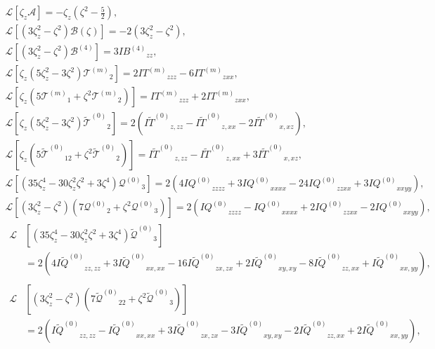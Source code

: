 \documentclass[]{elsarticle} %
\newcommand{\B}{\ensuremath{\mathcal{B}^{(4)}}}
\newcommand{\Q}{\ensuremath{\mathcal{Q}^{(0)}}}
\newcommand{\T}[1]{\ensuremath{\mathcal{T}^{(#1)}}}
\newcommand{\TT}{\ensuremath{\tilde{\mathcal{T}}^{(0)}}}
\newcommand{\QQ}{\ensuremath{\tilde{\mathcal{Q}}^{(0)}}}
\newcommand{\IF}[2][0]{\ensuremath{I{#2}^{(#1)}}}
\newcommand{\IFF}[1]{\ensuremath{I\tilde{#1}^{(0)}}}
\begin{document}
\begin{gather}
    \mathcal{L}\left[\zeta_z\mathcal{A}\right]
        = -\zeta_z\left(\zeta^2-\frac52\right), \label{eq:A}\\[6pt]
    \mathcal{L}\left[\left(3\zeta_z^2 - \zeta^2\right)\mathcal{B}(\zeta)\right]
        = -2\left(3\zeta_z^2 - \zeta^2\right), \label{eq:B}\\
    \mathcal{L}\left[\left(3\zeta_z^2 - \zeta^2\right)\B\right]
        = 3\IF[4]{B}_{zz}, \label{eq:B4}\\[6pt]
    \mathcal{L}\left[\zeta_z\left(5\zeta_z^2 - 3\zeta^2\right)\T{m}_2\right]
        = 2\IF[m]{T}_{zzz} - 6\IF[m]{T}_{zxx}, \label{eq:Tm1}\\
    \mathcal{L}\left[\zeta_z\left(5\T{m}_1 + \zeta^2\T{m}_2\right)\right]
        = \IF[m]{T}_{zzz} + 2\IF[m]{T}_{zxx}, \label{eq:Tm2}\\[6pt]
    \mathcal{L}\left[\zeta_z\left(5\zeta_z^2 - 3\zeta^2\right)\TT_2\right]
        = 2\left(\IFF{T}_{z,zz} - \IFF{T}_{z,xx} - 2\IFF{T}_{x,xz}\right), \label{eq:TT1}\\
    \mathcal{L}\left[\zeta_z\left(5\TT_{12} + \zeta^2\TT_2\right)\right]
        = \IFF{T}_{z,zz} - \IFF{T}_{z,xx} + 3\IFF{T}_{x,xz}, \label{eq:TT2}\\[6pt]
    \mathcal{L}\left[\left(35\zeta_z^4 - 30\zeta_z^2\zeta^2 + 3\zeta^4\right)\Q_3\right]
        = 2\left( 4\IF{Q}_{zzzz} + 3\IF{Q}_{xxxx} - 24\IF{Q}_{zzxx} + 3\IF{Q}_{xxyy} \right), \label{eq:Q1}\\
    \mathcal{L}\left[\left(3\zeta_z^2 - \zeta^2\right)\left(7\Q_2 + \zeta^2\Q_3\right)\right]
        = 2\left( \IF{Q}_{zzzz} - \IF{Q}_{xxxx} + 2\IF{Q}_{zzxx} - 2\IF{Q}_{xxyy} \right), \label{eq:Q2}\\[6pt]
    \begin{aligned}
    \mathcal{L}&\left[\left(35\zeta_z^4 - 30\zeta_z^2\zeta^2 + 3\zeta^4\right)\QQ_3\right] \\
        &= 2\left( 4\IFF{Q}_{zz,zz} + 3\IFF{Q}_{xx,xx} - 16\IFF{Q}_{zx,zx} + 2\IFF{Q}_{xy,xy} - 8\IFF{Q}_{zz,xx} + \IFF{Q}_{xx,yy} \right),
    \end{aligned}\label{eq:QQ1}\\
    \begin{aligned}
    \mathcal{L}&\left[\left(3\zeta_z^2 - \zeta^2\right)\left(7\QQ_{22} + \zeta^2\QQ_3\right)\right] \\
        &= 2\left( \IFF{Q}_{zz,zz} - \IFF{Q}_{xx,xx} + 3\IFF{Q}_{zx,zx} - 3\IFF{Q}_{xy,xy} - 2\IFF{Q}_{zz,xx} + 2\IFF{Q}_{xx,yy} \right),
    \end{aligned}\label{eq:QQ2}
\end{gather}
\end{document}

